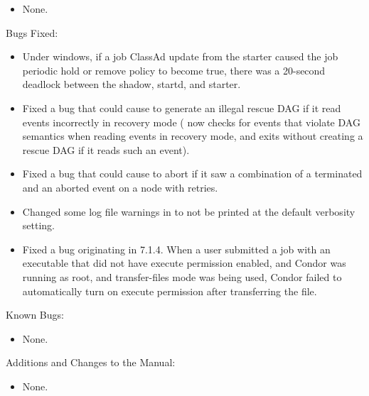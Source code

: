 \begin{itemize}

\item None.

\end{itemize}

\noindent Bugs Fixed:

\begin{itemize}

\item Under windows, if a job ClassAd update from the starter caused the
job periodic hold or remove policy to become true, there was a 20-second
deadlock between the shadow, startd, and starter.

\item Fixed a bug that could cause  to generate an
illegal rescue DAG if it read events incorrectly in recovery mode
( now checks for events that violate DAG semantics
when reading events in recovery mode, and exits without creating a
rescue DAG if it reads such an event).

\item Fixed a bug that could cause  to abort if it saw
a combination of a terminated and an aborted event on a node with
retries.

\item Changed some log file warnings in  to not be
printed at the default verbosity setting.

\item Fixed a bug originating in 7.1.4.  When a user submitted a job
with an executable that did not have execute permission enabled, and
Condor was running as root, and transfer-files mode was being used,
Condor failed to automatically turn on execute permission after
transferring the file.

\end{itemize}

\noindent Known Bugs:

\begin{itemize}

\item None.

\end{itemize}

\noindent Additions and Changes to the Manual:

\begin{itemize}

\item None.

\end{itemize}

